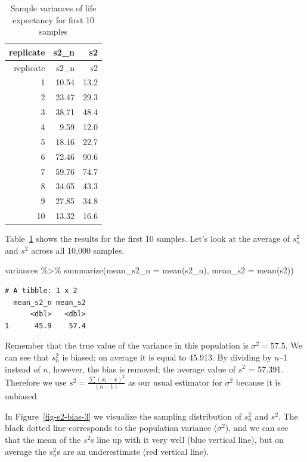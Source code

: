 \documentclass[
  letterpaper,
  DIV=11,
  numbers=noendperiod]{scrreprt}
\newenvironment{Shaded}{\begin{snugshade}}{\end{snugshade}}
\newcommand{\AttributeTok}[1]{\textcolor[rgb]{0.40,0.45,0.13}{#1}}
\newcommand{\FunctionTok}[1]{\textcolor[rgb]{0.28,0.35,0.67}{#1}}
\newcommand{\NormalTok}[1]{\textcolor[rgb]{0.00,0.23,0.31}{#1}}
\newcommand{\SpecialCharTok}[1]{\textcolor[rgb]{0.37,0.37,0.37}{#1}}
\theoremstyle{definition}
\theoremstyle{remark}
\begin{document}
\hypertarget{tbl-s2-bias-2}{}
\begin{longtable}[]{@{}rrr@{}}
\caption{\label{tbl-s2-bias-2}Sample variances of life expectancy for
first 10 samples}\tabularnewline
\toprule()
replicate & s2\_n & s2 \\
\midrule()
\endfirsthead
\toprule()
replicate & s2\_n & s2 \\
\midrule()
\endhead
1 & 10.54 & 13.2 \\
2 & 23.47 & 29.3 \\
3 & 38.71 & 48.4 \\
4 & 9.59 & 12.0 \\
5 & 18.16 & 22.7 \\
6 & 72.46 & 90.6 \\
7 & 59.76 & 74.7 \\
8 & 34.65 & 43.3 \\
9 & 27.85 & 34.8 \\
10 & 13.32 & 16.6 \\
\bottomrule()
\end{longtable}

Table~\ref{tbl-s2-bias-2} shows the results for the first 10 samples.
Let's look at the average of \(s_n^2\) and \(s^2\) across all 10,000
samples.

\begin{Shaded}
\begin{Highlighting}[]
\NormalTok{variances }\SpecialCharTok{\%\textgreater{}\%}  
  \FunctionTok{summarize}\NormalTok{(}\AttributeTok{mean\_s2\_n =} \FunctionTok{mean}\NormalTok{(s2\_n),}
            \AttributeTok{mean\_s2   =} \FunctionTok{mean}\NormalTok{(s2))}
\end{Highlighting}
\end{Shaded}

\begin{verbatim}
# A tibble: 1 x 2
  mean_s2_n mean_s2
      <dbl>   <dbl>
1      45.9    57.4
\end{verbatim}

Remember that the true value of the variance in this population is
\(\sigma^2 = 57.5\). We can see that \(s_n^2\) is biased; on average it
is equal to 45.913. By dividing by \(n – 1\) instead of \(n\), however,
the bias is removed; the average value of \(s^2\) = 57.391. Therefore we
use \(s^2= \frac{\sum(x_i - \bar{x})^2}{(n-1)}\) as our usual estimator
for \(\sigma^2\) because it is unbiased.

In Figure~\ref{fig-s2-bias-3} we visualize the sampling distribution of
\(s_n^2\) and \(s^2\). The black dotted line corresponds to the
population variance (\(\sigma^2\)), and we can see that the mean of the
\(s^2\)s line up with it very well (blue vertical line), but on average
the \(s_n^2\)s are an underestimate (red vertical line).
\end{document}
